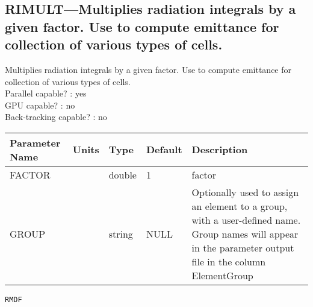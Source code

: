 \subsection{RIMULT---Multiplies radiation integrals by a given factor.  Use to compute emittance for collection of various types of cells.}
Multiplies radiation integrals by a given factor.  Use to compute emittance for collection of various types of cells.
\\
Parallel capable? : yes\\
GPU capable? : no\\
Back-tracking capable? : no\\
\begin{tabular}{|l|l|l|l|p{\descwidth}|} \hline
Parameter Name & Units & Type & Default & Description \\ \hline 
FACTOR &  & double &   1 & factor  \\ \hline 
GROUP &  & string & NULL & Optionally used to assign an element to a group, with a user-defined name.  Group names will appear in the parameter output file in the column ElementGroup  \\ \hline 
\end{tabular}

\newpage
\begin{center}{\Large\verb|RMDF|}\end{center}
